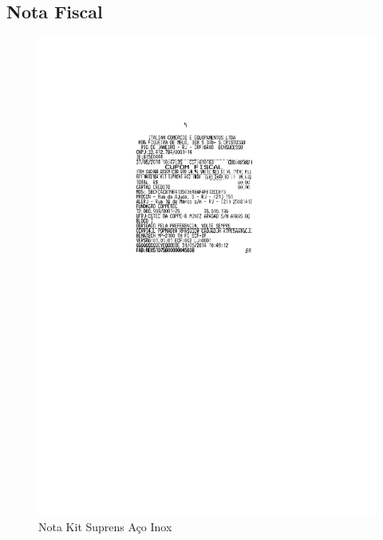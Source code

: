 \subsection{Nota Fiscal}
\begin{figure}[H]
 \centering
 \includegraphics[width=1\columnwidth]{Abracadeira/nota_kit.pdf}
 \caption{Nota Kit Suprens Aço Inox}
 \end{figure} 